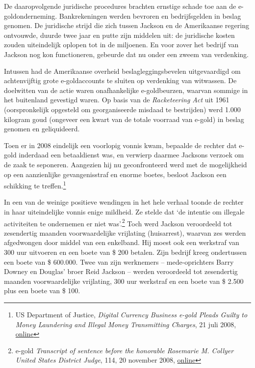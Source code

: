 \documentclass[
  a5paper,
  smalldemyvopaper,11pt,twoside,onecolumn,openright,extrafontsizes,
hidelinks]{memoir}
\begin{document}
De daaropvolgende juridische procedures brachten ernstige schade toe aan
de e-goldonderneming. Bankrekeningen werden bevroren en bedrijfsgelden
in beslag genomen. De juridische strijd die zich tussen Jackson en de
Amerikaanse regering ontvouwde, duurde twee jaar en putte zijn middelen
uit: de juridische kosten zouden uiteindelijk oplopen tot in de
miljoenen. En voor zover het bedrijf van Jackson nog kon functioneren,
gebeurde dat nu onder een zweem van verdenking.

Intussen had de Amerikaanse overheid beslagleggingsbevelen uitgevaardigd
om achtenvijftig grote e-goldaccounts te sluiten op verdenking van
witwassen. De doelwitten van de actie waren onafhankelijke
e-goldbeurzen, waarvan sommige in het buitenland gevestigd waren. Op
basis van de \emph{Racketeering Act} uit 1961 (oorspronkelijk opgesteld
om georganiseerde misdaad te bestrijden) werd 1.000 kilogram goud
(ongeveer een kwart van de totale voorraad van e-gold) in beslag genomen
en geliquideerd.

Toen er in 2008 eindelijk een voorlopig vonnis kwam, bepaalde de rechter
dat e-gold inderdaad een betaaldienst was, en verwierp daarmee Jacksons
verzoek om de zaak te seponeren. Aangezien hij nu geconfronteerd werd
met de mogelijkheid op een aanzienlijke gevangenisstraf en enorme
boetes, besloot Jackson een schikking te treffen.\footnote{\hspace{0pt}US
  Department of Justice, \emph{Digital Currency Business e-gold Pleads
  Guilty to Money Laundering and Illegal Money Transmitting Charges}, 21
  juli 2008,
  \href{https://www.justice.gov/archive/opa/pr/2008/July/08-crm-635.html}{online}}

In een van de weinige positieve wendingen in het hele verhaal toonde de
rechter in haar uiteindelijke vonnis enige mildheid. Ze stelde dat `de
intentie om illegale activiteiten te ondernemen er niet was'.\footnote{\hspace{0pt}e-gold
  \emph{Transcript of sentence before the honorable Rosemarie M. Collyer
  United States District Judge}, 114, 20 november 2008,
  \href{https://legalupdate.e-gold.com/2008/11/transcript-of-sentence-before-the-honorable-rosemarie-m-collyer-united-states-district-judge.html}{online}}
Toch werd Jackson veroordeeld tot zesendertig maanden voorwaardelijke
vrijlating (huisarrest), waarvan zes werden afgedwongen door middel van
een enkelband. Hij moest ook een werkstraf van 300 uur uitvoeren en een
boete van \$ 200 betalen. Zijn bedrijf kreeg ondertussen een boete van
\$ 600.000. Twee van zijn werknemers -- mede-oprichters Barry Downey en
Douglas' broer Reid Jackson -- werden veroordeeld tot zesendertig
maanden voorwaardelijke vrijlating, 300 uur werkstraf en een boete van
\$ 2.500 plus een boete van \$ 100.
\end{document}
